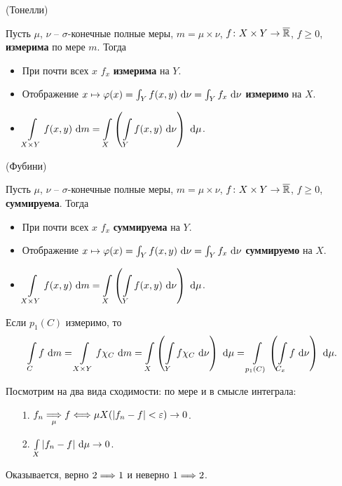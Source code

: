 \begin{theorem}(Тонелли)
    
    Пусть $\mu$, $\nu$ -- $\sigma$-конечные полные меры, $m = \mu \times \nu$,
    $f \colon X \times Y \to \overline{\mathbb{R}}$, $f \geqslant 0$, \textbf{измерима} по мере $m$.
    Тогда
    \begin{itemize}
        \item При почти всех $x$ $f_x$ \textbf{измерима} на $Y$.
        \item Отображение $x \mapsto \varphi(x) = \int_{Y}{f(x, y) ~\mathrm{d}\nu} 
        = \int_{Y}{f_x ~\mathrm{d}\nu}$ \textbf{измеримо} на $X$.
        \item $\displaystyle \int\limits_{X \times Y}{f(x, y) ~\mathrm{d} m} 
            = \int\limits_{X}{\left(\int\limits_{Y}{f(x, y) ~\mathrm{d}\nu}\right) ~\mathrm{d}\mu}$.
    \end{itemize} 
\end{theorem}

\begin{theorem}(Фубини)
    
    Пусть $\mu$, $\nu$ -- $\sigma$-конечные полные меры, $m = \mu \times \nu$,
    $f \colon X \times Y \to \overline{\mathbb{R}}$, $f \geqslant 0$, \textbf{суммируема}.
    Тогда
    \begin{itemize}
        \item При почти всех $x$ $f_x$ \textbf{суммируема} на $Y$.
        \item Отображение $x \mapsto \varphi(x) = \int_{Y}{f(x, y) ~\mathrm{d}\nu} 
            = \int_{Y}{f_x ~\mathrm{d}\nu}$ \textbf{суммируемо} на $X$.
        \item $\displaystyle \int\limits_{X \times Y}{f(x, y) ~\mathrm{d} m} 
            = \int\limits_{X}{\left(\int\limits_{Y}{f(x, y) ~\mathrm{d}\nu}\right) ~\mathrm{d}\mu}$.
    \end{itemize} 

\end{theorem}

\begin{corollary}
    Если $p_1(C)$ измеримо, то
\[
    \int\limits_{C}{f ~\mathrm{d} m} = \int\limits_{X \times Y}{f \chi_C ~\mathrm{d} m} 
    = \int\limits_{X}{\left(\int\limits_{Y}{f \chi_C ~\mathrm{d}\nu}\right) ~\mathrm{d}\mu}
    = \int\limits_{p_1(C)}{\left(\int\limits_{C_x}{f ~\mathrm{d}\nu}\right) ~\mathrm{d}\mu}
.\]
\end{corollary}

\begin{remark}
    Посмотрим на два вида сходимости: по мере и в смысле интеграла:
    \begin{itemize}
        \item[1.] $f_n \underset{\mu}{\Longrightarrow} f \Longleftrightarrow \mu X(|f_n - f| < \varepsilon) \to 0$.
        \item[2.] $\int\limits_{X}{|f_n - f| ~\mathrm{d}\mu} \to 0$.
    \end{itemize} 
    Оказывается, верно $2 \Longrightarrow 1$ и неверно $1 \Longrightarrow 2$.
\end{remark}


